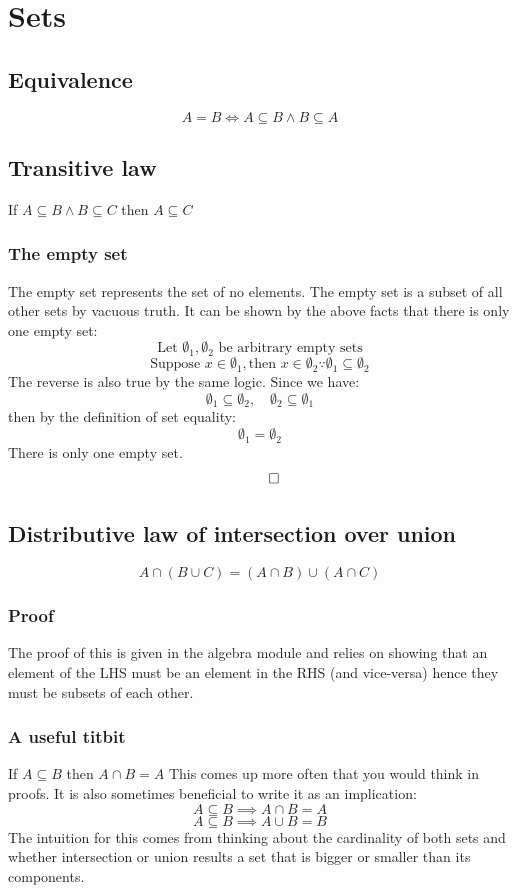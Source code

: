 \documentclass[12pt]{article}
\begin{document}
\section{Sets}
\subsection*{Equivalence}
\[A=B\iff A\subseteq B \land B\subseteq A\]
\subsection*{Transitive law}
If \(A\subseteq B \land B\subseteq C\) then \(A\subseteq C\)
\subsubsection*{The empty set}
The empty set represents the set of no elements. The empty set is a subset of all other sets by vacuous truth. It can be shown by the above facts that there is only one empty set:
\[\text{Let }\emptyset_1,\emptyset_2\text{ be arbitrary empty sets}\]
\[\text{Suppose } x\in\emptyset_1,\text{then }x\in\emptyset_2\because \emptyset_1\subseteq\emptyset_2\]
The reverse is also true by the same logic. Since we have:
\[\emptyset_1\subseteq\emptyset_2,\quad\emptyset_2\subseteq\emptyset_1\]
then by the definition of set equality:
\[\emptyset_1=\emptyset_2\]
There is only one empty set.
\[\qed\]
\subsection*{Distributive law of intersection over union}
\[A\cap(B\cup C)=(A\cap B)\cup(A\cap C)\]
\subsubsection*{Proof}
The proof of this is given in the algebra module and relies on showing that an element of the LHS must be an element in the RHS (and vice-versa) hence they must be subsets of each other.
\subsubsection*{A useful titbit}
If \(A\subseteq B\) then \(A\cap B=A\)
This comes up more often that you would think in proofs. It is also sometimes beneficial to write it as an implication:
\[A\subseteq B\implies A\cap B = A\]
\[A\subseteq B \implies A\cup B = B\]
The intuition for this comes from thinking about the cardinality of both sets and whether intersection or union results a set that is bigger or smaller than its components.
\end{document}
